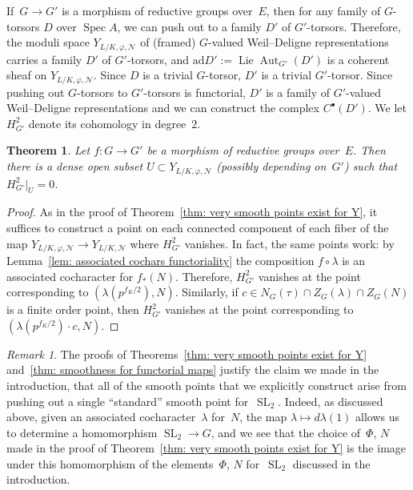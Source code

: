 \documentclass{amsart}
\DeclareMathOperator{\Lie}{Lie}
\DeclareMathOperator{\SL}{SL}
\def\ad{\mathrm{ad}}
\newtheorem{thm}[subsubsection]{Theorem}
\theoremstyle{definition}
\theoremstyle{remark}
\newtheorem{rem}[subsubsection]{Remark}
\newcommand{\mar}[1]{}
\newcommand{\mar}[1]{\marginpar{\raggedright\tiny squirrel #1}}
\DeclareMathOperator{\Aut}{Aut}
\DeclareMathOperator{\GL}{GL}
\DeclareMathOperator{\Spec}{Spec}
\begin{document}
If~$G\to G'$ is a morphism of reductive groups over~$E$, then for any family of $G$-torsors $D$ over $\Spec A$, we can push out to a family $D'$ of $G'$-torsors.  Therefore, the moduli space $Y_{L/K,\varphi,\mathcal N}$ of (framed) $G$-valued Weil--Deligne representations carries a family $D'$ of $G'$-torsors, and $\ad D':=\Lie\Aut_{G'}(D')$ is a coherent sheaf on $Y_{L/K,\varphi,\mathcal N}$.  Since $D$ is a trivial $G$-torsor, $D'$ is a trivial $G'$-torsor.  Since pushing out $G$-torsors to $G'$-torsors is functorial, $D'$ is a family of $G'$-valued Weil--Deligne representations and we can construct the complex $C^\bullet(D')$.  We let $H^2_{G'}$ denote its cohomology in degree~$2$.

\begin{thm}%
  \label{thm: smoothness for functorial maps}Let $f:G\to G'$ be a
  morphism of reductive groups over~$E$. Then there is a dense open
  subset $U\subset Y_{L/K,\varphi,\mathcal N}$ \emph{(}possibly depending
  on~$G'$\emph{)} such that $H^2_{G'}|_U=0$.
\end{thm}
\begin{proof}%
As in the proof of Theorem~\ref{thm: very smooth points exist for Y}, it suffices to construct a point on each connected component of each fiber of the map $Y_{L/K,\varphi,\mathcal N}\rightarrow Y_{L/K,\mathcal N}$ where $H^2_{G'}$ vanishes.  In fact, the same points work: by Lemma~\ref{lem: associated cochars functoriality} the composition $f\circ\lambda$ is an associated cocharacter for $f_\ast(N)$.  Therefore, $H^2_{G'}$ vanishes at the point corresponding to $(\lambda(p^{f_K/2}),N)$.  Similarly, if $c\in N_G(\tau)\cap Z_G(\lambda)\cap Z_G(N)$ is a finite order point, then $H_{G'}^2$ vanishes at the point corresponding to $(\lambda(p^{f_K/2})\cdot c,N)$.
\end{proof}

\begin{rem}
  \label{rem: thinking of everything as coming from SL2}The proofs of
  Theorems~\ref{thm: very smooth points exist for Y} and~\ref{thm:
    smoothness for functorial maps} justify the claim we made in the
  introduction, that all of the smooth points that we explicitly
  construct arise from pushing out a single ``standard'' smooth point
  for~$\SL_2$. Indeed, as discussed above, given an associated
  cocharacter~$\lambda$ for~$N$, the map $\lambda\mapsto
  d\lambda(1)$ allows us to determine a homomorphism $\SL_2\to G$, and
  we see that the choice of~$\Phi$, $N$ made in the proof of
  Theorem~\ref{thm: very smooth points exist for Y} is the image under
  this homomorphism of the elements~$\Phi$, $N$ for~$\SL_2$ discussed
  in the introduction.
\end{rem}
\end{document}
